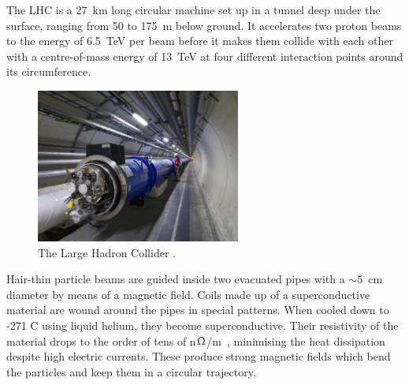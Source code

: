 The LHC is a 27~km long circular machine set up in a tunnel deep under the surface, ranging from 50 to 175~m below ground. It accelerates two proton beams to the energy of 6.5~TeV per beam before it makes them collide with each other with a centre-of-mass energy of 13~TeV at four different interaction points around its circumference. 
\begin{figure}[!t]
\centering
\includegraphics[width=0.6\textwidth]{01_introduction/pics/lhc}
\caption{The Large Hadron Collider \cite{Maximilien:1324852}.}
\label{fig:lhc}
\end{figure}
Hair-thin particle beams are guided inside two evacuated pipes with a $\sim$5~cm diameter by means of a magnetic field. Coils made up of a superconductive material are wound around the pipes in special patterns. When cooled down to -271 \textdegree C using liquid helium, they become superconductive. Their resistivity of the material drops to the order of tens of n$\Upomega$/m~\cite{Devred:796105}, minimising the heat dissipation despite high electric currents. These produce strong magnetic fields which bend the particles and keep them in a circular trajectory. 

